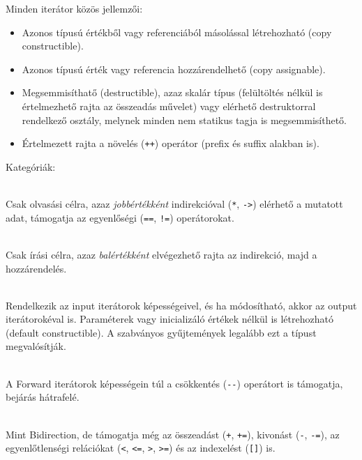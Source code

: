 \documentclass[usenames,dvipsnames,aspectratio=169]{beamer}
\begin{document}
\begin{frame}
    Minden iterátor közös jellemzői:
    \begin{itemize}
        \item Azonos típusú értékből vagy referenciából másolással létrehozható (copy constructible).
        \item Azonos típusú érték vagy referencia hozzárendelhető (copy assignable).
        \item Megsemmisíthatő (destructible), azaz skalár típus (felültöltés nélkül is értelmezhető rajta az összeadás művelet) vagy elérhető destruktorral rendelkező osztály, melynek minden nem statikus tagja is megsemmisíthető.
        \item Értelmezett rajta a növelés (\texttt{++}) operátor (prefix és suffix alakban is).
    \end{itemize}
\end{frame}

\begin{frame}
    Kategóriák:
    \begin{description}[m]
        \item[Input] \hfill \\ Csak olvasási célra, azaz \emph{jobbértékként} indirekcióval (\texttt{*}, \texttt{->}) elérhető a mutatott adat, támogatja az egyenlőségi (\texttt{==}, \texttt{!=}) operátorokat.
        \item[Output] \hfill \\ Csak írási célra, azaz \emph{balértékként} elvégezhető rajta az indirekció, majd a hozzárendelés.
        \item[Forward] \hfill \\ Rendelkezik az input iterátorok képességeivel, és ha módosítható, akkor az output iterátorokéval is. Paraméterek vagy inicializáló értékek nélkül is létrehozható (default constructible). A szabványos gyűjtemények legalább ezt a típust megvalósítják.
    \end{description}
\end{frame}

\begin{frame}
    \begin{description}[m]
        \small
        \item[Bidirectional] \hfill \\ A Forward iterátorok képességein túl a csökkentés (\texttt{-{-}}) operátort is támogatja, bejárás hátrafelé.
        \item[Random access] \hfill \\ Mint Bidirection, de támogatja még az összeadást (\texttt{+}, \texttt{+=}), kivonást (\texttt{-}, \texttt{-=}), az egyenlőtlenségi relációkat (\texttt{<}, \texttt{<=}, \texttt{>}, \texttt{>=}) és az indexelést (\texttt{[]}) is. 
    \end{description}
    \begin{exampleblock}{}
        \scriptsize
        
    \end{exampleblock}
\end{frame}

\end{document}
